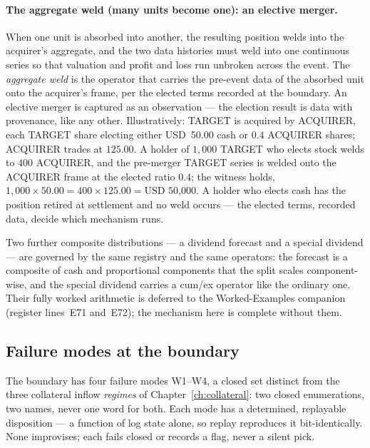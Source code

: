 \documentclass[11pt,a4paper]{article}
\newcommand{\USD}[1]{\mbox{USD~#1}}
\begin{document}
\paragraph{The aggregate weld (many units become one): an elective merger.}
When one unit is absorbed into another, the resulting position welds into the acquirer's
aggregate, and the two data histories must weld into one continuous series so that valuation
and profit and loss run unbroken across the event. The \emph{aggregate weld} is the operator
that carries the pre-event data of the absorbed unit onto the acquirer's frame, per the
elected terms recorded at the boundary. An elective merger is captured as an observation ---
the election result is data with provenance, like any other. Illustratively: TARGET is
acquired by ACQUIRER, each TARGET share electing either \USD{50.00} cash or $0.4$ ACQUIRER
shares; ACQUIRER trades at $125.00$. A holder of $1{,}000$ TARGET who elects stock welds to
$400$ ACQUIRER, and the pre-merger TARGET series is welded onto the ACQUIRER frame at the
elected ratio $0.4$; the witness holds, $1{,}000 \times 50.00 = 400 \times 125.00 =
\USD{50{,}000}$. A holder who elects cash has the position retired at settlement and no weld
occurs --- the elected terms, recorded data, decide which mechanism runs.

Two further composite distributions --- a dividend forecast and a special dividend --- are
governed by the same registry and the same operators: the forecast is a composite of cash
and proportional components that the split scales component-wise, and the special dividend
carries a cum/ex operator like the ordinary one. Their fully worked arithmetic is deferred
to the Worked-Examples companion (register lines~E71 and~E72); the mechanism here is
complete without them.

\subsection{Failure modes at the boundary}\label{sec:failures}

The boundary has four failure modes W1--W4, a closed set distinct from the three collateral
inflow \emph{regimes} of Chapter~\ref{ch:collateral}: two closed enumerations, two names, never
one word for both. Each mode has a determined, replayable disposition --- a
function of log state alone, so replay reproduces it bit-identically. None improvises; each
fails closed or records a flag, never a silent pick.
\end{document}
